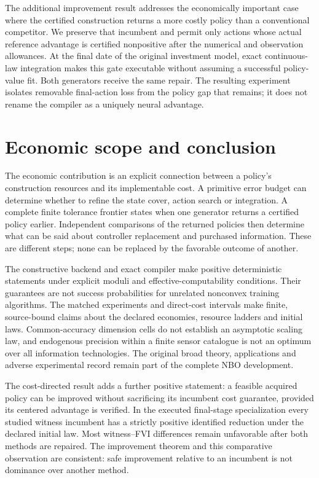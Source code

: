 \documentclass[ecta,nameyear,draft]{econsocart}
\begin{document}
The additional improvement result addresses the economically important case where the certified construction returns a more costly policy than a conventional competitor. We preserve that incumbent and permit only actions whose actual reference advantage is certified nonpositive after the numerical and observation allowances. At the final date of the original investment model, exact continuous-law integration makes this gate executable without assuming a successful policy-value fit. Both generators receive the same repair. The resulting experiment isolates removable final-action loss from the policy gap that remains; it does not rename the compiler as a uniquely neural advantage.










\section{Economic scope and conclusion}\label{sec:conclusion49}
The economic contribution is an explicit connection between a policy's construction resources and its implementable cost. A primitive error budget can determine whether to refine the state cover, action search or integration. A complete finite tolerance frontier states when one generator returns a certified policy earlier. Independent comparisons of the returned policies then determine what can be said about controller replacement and purchased information. These are different steps; none can be replaced by the favorable outcome of another.

The constructive backend and exact compiler make positive deterministic statements under explicit moduli and effective-computability conditions. Their guarantees are not success probabilities for unrelated nonconvex training algorithms. The matched experiments and direct-cost intervals make finite, source-bound claims about the declared economies, resource ladders and initial laws. Common-accuracy dimension cells do not establish an asymptotic scaling law, and endogenous precision within a finite sensor catalogue is not an optimum over all information technologies. The original broad theory, applications and adverse experimental record remain part of the complete NBO development.

The cost-directed result adds a further positive statement: a feasible acquired policy can be improved without sacrificing its incumbent cost guarantee, provided its centered advantage is verified. In the executed final-stage specialization every studied witness incumbent has a strictly positive identified reduction under the declared initial law. Most witness--FVI differences remain unfavorable after both methods are repaired. The improvement theorem and this comparative observation are consistent: safe improvement relative to an incumbent is not dominance over another method.
\end{document}
